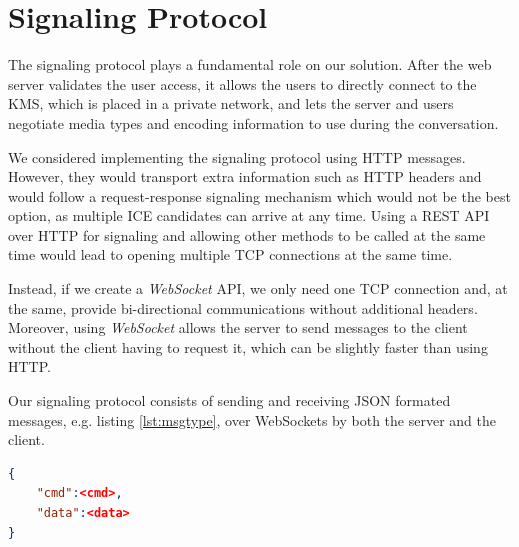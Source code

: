 \section{Signaling Protocol}

The signaling protocol plays a fundamental role on our solution.
After the web server validates the user access, it allows the users to directly connect to the \ac{KMS}, which is placed in a private network, and lets the server and users negotiate media types and encoding information to use during the conversation.

We considered implementing the signaling protocol using \ac{HTTP} messages.
However, they would transport extra information such as \ac{HTTP} headers and would follow a request-response signaling mechanism which would not be the best option, as multiple ICE candidates can arrive at any time. Using a \ac{REST} \ac{API} over \ac{HTTP} for signaling and allowing other methods to be called at the same time would lead to opening multiple \ac{TCP} connections at the same time.

Instead, if we create a \emph{WebSocket} \ac{API}, we only need one \ac{TCP} connection and, at the same, provide bi-directional communications without additional headers. Moreover, using \emph{WebSocket} allows the server to send messages to the client without the client having to request it, which can be slightly faster than using \ac{HTTP}.

Our signaling protocol consists of sending and receiving \ac{JSON} formated messages, e.g. listing \ref{lst:msgtype}, over WebSockets by both the server and the client. 

\begin{minipage}{\linewidth}
\begin{lstlisting}[caption={General structure of our WebSocket messages},label={lst:msgtype},language=json]
{
	"cmd":<cmd>,
	"data":<data>
}
\end{lstlisting}
\end{minipage}

